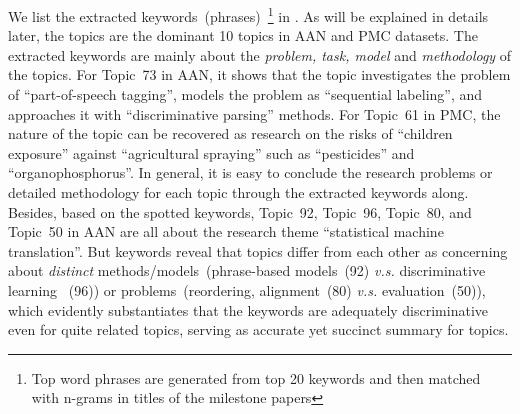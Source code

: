 We list the extracted keywords~(phrases)~\footnote{Top word phrases are
generated from top 20 keywords and then matched with n-grams in titles of the
milestone papers} in . As will be explained in details
later, the topics are the dominant 10 topics in AAN and PMC datasets.  The
extracted keywords are mainly about the \emph{problem, task, model} and
\emph{methodology} of the topics.  For Topic~73 in AAN, it shows that the topic
investigates the problem of ``part-of-speech tagging'', models the problem as
``sequential labeling'', and approaches it with  ``discriminative parsing''
methods.  For Topic~61 in PMC, the nature of the topic can be recovered as
research on the risks of ``children exposure'' against ``agricultural spraying''
such as ``pesticides'' and ``organophosphorus''. In general, it is easy to
conclude the research problems or detailed methodology for each topic through
the extracted keywords along.  Besides, based on the spotted keywords, Topic~92,
Topic~96, Topic~80, and Topic~50 in AAN are all about the research theme
``statistical machine translation''.  But keywords reveal that topics differ
from each other as concerning about \emph{distinct} methods/models~(phrase-based
models~{\scriptsize (92)} \emph{v.s.} discriminative learning~{\scriptsize
(96)}) or problems~(reordering, alignment~{\scriptsize (80)} \emph{v.s.}
evaluation~{\scriptsize (50)}), which evidently substantiates that the keywords
are adequately discriminative even for quite related topics, serving as accurate
yet succinct summary for topics.

